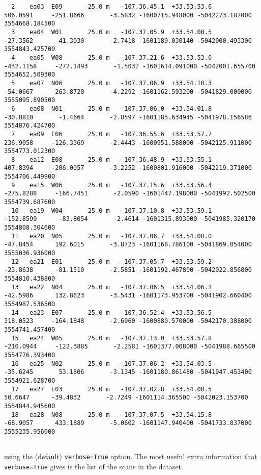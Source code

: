 \begin{verbatim}
  2    ea03  E09       25.0 m   -107.36.45.1  +33.53.53.6        506.0591     -251.8666       -3.5832 -1600715.948000 -5042273.187000  3554668.184500
  3    ea04  W01       25.0 m   -107.37.05.9  +33.54.00.5        -27.3562      -41.3030       -2.7418 -1601189.030140 -5042000.493300  3554843.425700
  4    ea05  W08       25.0 m   -107.37.21.6  +33.53.53.0       -432.1158     -272.1493       -1.5032 -1601614.091000 -5042001.655700  3554652.509300
  5    ea07  N06       25.0 m   -107.37.06.9  +33.54.10.3        -54.0667      263.8720       -4.2292 -1601162.593200 -5041829.000000  3555095.890500
  6    ea08  N01       25.0 m   -107.37.06.0  +33.54.01.8        -30.8810       -1.4664       -2.8597 -1601185.634945 -5041978.156586  3554876.424700
  7    ea09  E06       25.0 m   -107.36.55.6  +33.53.57.7        236.9058     -126.3369       -2.4443 -1600951.588000 -5042125.911000  3554773.012300
  8    ea12  E08       25.0 m   -107.36.48.9  +33.53.55.1        407.8394     -206.0057       -3.2252 -1600801.916000 -5042219.371000  3554706.449900
  9    ea15  W06       25.0 m   -107.37.15.6  +33.53.56.4       -275.8288     -166.7451       -2.0590 -1601447.198000 -5041992.502500  3554739.687600
  10   ea19  W04       25.0 m   -107.37.10.8  +33.53.59.1       -152.8599      -83.8054       -2.4614 -1601315.893000 -5041985.320170  3554808.304600
  11   ea20  N05       25.0 m   -107.37.06.7  +33.54.08.0        -47.8454      192.6015       -3.8723 -1601168.786100 -5041869.054000  3555036.936000
  12   ea21  E01       25.0 m   -107.37.05.7  +33.53.59.2        -23.8638      -81.1510       -2.5851 -1601192.467800 -5042022.856800  3554810.438800
  13   ea22  N04       25.0 m   -107.37.06.5  +33.54.06.1        -42.5986      132.8623       -3.5431 -1601173.953700 -5041902.660400  3554987.536500
  14   ea23  E07       25.0 m   -107.36.52.4  +33.53.56.5        318.0523     -164.1848       -2.6960 -1600880.570000 -5042170.388000  3554741.457400
  15   ea24  W05       25.0 m   -107.37.13.0  +33.53.57.8       -210.0944     -122.3885       -2.2581 -1601377.008000 -5041988.665500  3554776.393400
  16   ea25  N02       25.0 m   -107.37.06.2  +33.54.03.5        -35.6245       53.1806       -3.1345 -1601180.861480 -5041947.453400  3554921.628700
  17   ea27  E03       25.0 m   -107.37.02.8  +33.54.00.5         50.6647      -39.4832       -2.7249 -1601114.365500 -5042023.153700  3554844.945600
  18   ea28  N08       25.0 m   -107.37.07.5  +33.54.15.8        -68.9057      433.1889       -5.0602 -1601147.940400 -5041733.837000  3555235.956000


\end{verbatim}
\normalsize
using the (default) {\tt verbose=True} option.
The most useful extra information that {\tt verbose=True} gives
is the list of the scans in the dataset.


